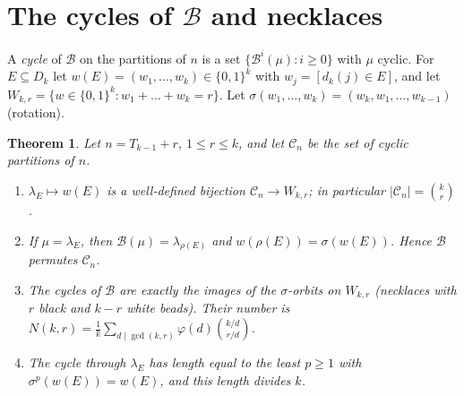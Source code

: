 \documentclass[11pt]{article}
\newtheorem{theorem}{Theorem}[section]
\theoremstyle{definition}
\newcommand{\B}{\mathcal{B}}
\renewcommand{\le}{\leqslant}
\renewcommand{\ge}{\geqslant}
\begin{document}
\section{The cycles of $\B$ and necklaces}\label{sec:necklace}

A \emph{cycle} of $\B$ on the partitions of $n$ is a set $\{\B^i(\mu):i\ge0\}$ with $\mu$ cyclic.  For
$E\subseteq D_k$ let $w(E)=(w_1,\dots,w_k)\in\{0,1\}^k$ with $w_j=[d_k(j)\in E]$, and let
$W_{k,r}=\{w\in\{0,1\}^k:w_1+\dots+w_k=r\}$.  Let $\sigma(w_1,\dots,w_k)=(w_k,w_1,\dots,w_{k-1})$ (rotation).

\begin{theorem}\label{thm:necklace}
Let $n=T_{k-1}+r$, $1\le r\le k$, and let $\mathcal C_n$ be the set of cyclic partitions of $n$.
\begin{enumerate}
\item[(a)] $\lambda_E\mapsto w(E)$ is a well-defined bijection $\mathcal C_n\to W_{k,r}$; in particular
$|\mathcal C_n|=\binom kr$.
\item[(b)] If $\mu=\lambda_E$, then $\B(\mu)=\lambda_{\rho(E)}$ and $w(\rho(E))=\sigma(w(E))$.  Hence $\B$ permutes
$\mathcal C_n$.
\item[(c)] The cycles of $\B$ are exactly the images of the $\sigma$-orbits on $W_{k,r}$ (necklaces with $r$
black and $k-r$ white beads).  Their number is $N(k,r)=\frac1k\sum_{d\mid\gcd(k,r)}\varphi(d)\binom{k/d}{r/d}$.
\item[(d)] The cycle through $\lambda_E$ has length equal to the least $p\ge1$ with $\sigma^p(w(E))=w(E)$, and this
length divides $k$.
\end{enumerate}
\end{theorem}
\end{document}
